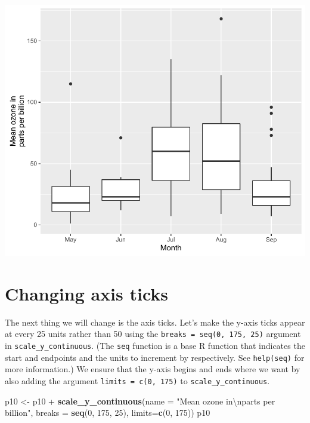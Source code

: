 \documentclass[]{article}
\newenvironment{Shaded}{\begin{snugshade}}{\end{snugshade}}
\newcommand{\KeywordTok}[1]{\textcolor[rgb]{0.13,0.29,0.53}{\textbf{{#1}}}}
\newcommand{\DataTypeTok}[1]{\textcolor[rgb]{0.13,0.29,0.53}{{#1}}}
\newcommand{\DecValTok}[1]{\textcolor[rgb]{0.00,0.00,0.81}{{#1}}}
\newcommand{\CharTok}[1]{\textcolor[rgb]{0.31,0.60,0.02}{{#1}}}
\newcommand{\StringTok}[1]{\textcolor[rgb]{0.31,0.60,0.02}{{#1}}}
\newcommand{\NormalTok}[1]{{#1}}
\begin{document}
\begin{center}\includegraphics{10_Boxplots_pdf/box_3-1} \end{center}

\section{Changing axis ticks}\label{changing-axis-ticks}

The next thing we will change is the axis ticks. Let's make the y-axis
ticks appear at every 25 units rather than 50 using the
\texttt{breaks\ =\ seq(0,\ 175,\ 25)} argument in
\texttt{scale\_y\_continuous}. (The \texttt{seq} function is a base R
function that indicates the start and endpoints and the units to
increment by respectively. See \texttt{help(seq)} for more information.)
We ensure that the y-axis begins and ends where we want by also adding
the argument \texttt{limits\ =\ c(0,\ 175)} to
\texttt{scale\_y\_continuous}.

\begin{Shaded}
\begin{Highlighting}[]
\NormalTok{p10 <-}\StringTok{ }\NormalTok{p10 +}\StringTok{ }\KeywordTok{scale_y_continuous}\NormalTok{(}\DataTypeTok{name =} \StringTok{"Mean ozone in}\CharTok{\textbackslash{}n}\StringTok{parts per billion"}\NormalTok{,}
    \DataTypeTok{breaks =} \KeywordTok{seq}\NormalTok{(}\DecValTok{0}\NormalTok{, }\DecValTok{175}\NormalTok{, }\DecValTok{25}\NormalTok{), }\DataTypeTok{limits=}\KeywordTok{c}\NormalTok{(}\DecValTok{0}\NormalTok{, }\DecValTok{175}\NormalTok{))}
\NormalTok{p10}
\end{Highlighting}
\end{Shaded}
\end{document}

